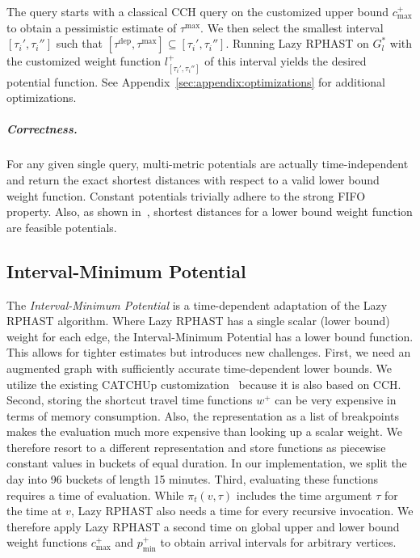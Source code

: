 \documentclass[a4paper,UKenglish,cleveref, autoref, thm-restate,anonymous]{lipics-v2021}
\newcommand*{\pred}{p}
\newcommand*{\comb}{c}
\newcommand*{\tdep}{\tau^{\operatorname{dep}}}
\newcommand*{\tmax}{\tau^{\max}}
\begin{document}
The query starts with a classical CCH query on the customized upper bound $\comb^+_{\max}$ to obtain a pessimistic estimate of $\tmax$.
We then select the smallest interval $[\tau_i', \tau_i'']$ such that $[\tdep,\tmax] \subseteq [\tau_i', \tau_i'']$.
Running Lazy RPHAST on $G^*_l$ with the customized weight function $l_{[\tau_i', \tau_i'']}^+$ of this interval yields the desired potential function.
See Appendix~\ref{sec:appendix:optimizations} for additional optimizations.

\subparagraph{Correctness.}
For any given single query, multi-metric potentials are actually time-independent and return the exact shortest distances with respect to a valid lower bound weight function.
Constant potentials trivially adhere to the strong FIFO property.
Also, as shown in~\cite{strasser_et_al:LIPIcs.SEA.2021.6}, shortest distances for a lower bound weight function are feasible potentials.

\subsection{Interval-Minimum Potential}

The \emph{Interval-Minimum Potential} is a time-dependent adaptation of the Lazy RPHAST algorithm.
Where Lazy RPHAST has a single scalar (lower bound) weight for each edge, the Interval-Minimum Potential has a lower bound function.
This allows for tighter estimates but introduces new challenges.
First, we need an augmented graph with sufficiently accurate time-dependent lower bounds.
We utilize the existing CATCHUp customization~\cite{swz-sfert-21} because it is also based on CCH.
Second, storing the shortcut travel time functions $w^+$ can be very expensive in terms of memory consumption.
Also, the representation as a list of breakpoints makes the evaluation much more expensive than looking up a scalar weight.
We therefore resort to a different representation and store functions as piecewise constant values in buckets of equal duration.
In our implementation, we split the day into 96 buckets of length 15 minutes.
Third, evaluating these functions requires a time of evaluation.
While $\pi_t(v, \tau)$ includes the time argument $\tau$ for the time at $v$, Lazy RPHAST also needs a time for every recursive invocation.
We therefore apply Lazy RPHAST a second time on global upper and lower bound weight functions $\comb_{\max}^+$ and $\pred_{\min}^+$ to obtain arrival intervals for arbitrary vertices.
\end{document}
